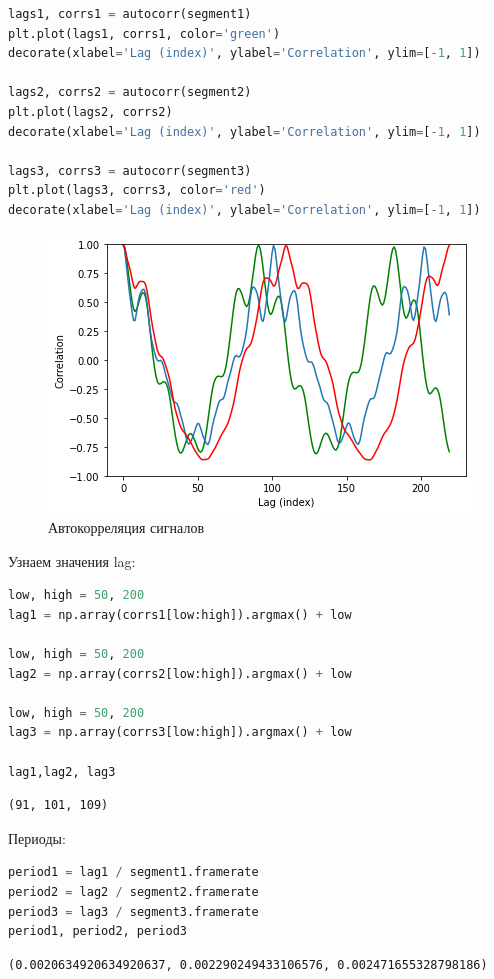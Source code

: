 \begin{lstlisting}[language=Python]
lags1, corrs1 = autocorr(segment1)
plt.plot(lags1, corrs1, color='green')
decorate(xlabel='Lag (index)', ylabel='Correlation', ylim=[-1, 1])

lags2, corrs2 = autocorr(segment2)
plt.plot(lags2, corrs2)
decorate(xlabel='Lag (index)', ylabel='Correlation', ylim=[-1, 1])

lags3, corrs3 = autocorr(segment3)
plt.plot(lags3, corrs3, color='red')
decorate(xlabel='Lag (index)', ylabel='Correlation', ylim=[-1, 1])
\end{lstlisting}
\begin{figure}[H]
	\begin{center}
		\includegraphics[scale=1]{fig/lab05/lab05_7_0.png}
		\caption{Автокорреляция сигналов}
	\end{center}
\end{figure}

Узнаем значения lag:

\begin{lstlisting}[language=Python]
low, high = 50, 200
lag1 = np.array(corrs1[low:high]).argmax() + low

low, high = 50, 200
lag2 = np.array(corrs2[low:high]).argmax() + low

low, high = 50, 200
lag3 = np.array(corrs3[low:high]).argmax() + low

lag1,lag2, lag3
\end{lstlisting}
\begin{lstlisting}
(91, 101, 109)
\end{lstlisting}

Периоды:

\begin{lstlisting}[language=Python]
period1 = lag1 / segment1.framerate
period2 = lag2 / segment2.framerate
period3 = lag3 / segment3.framerate
period1, period2, period3
\end{lstlisting}
\begin{lstlisting}
(0.0020634920634920637, 0.002290249433106576, 0.002471655328798186)
\end{lstlisting}

